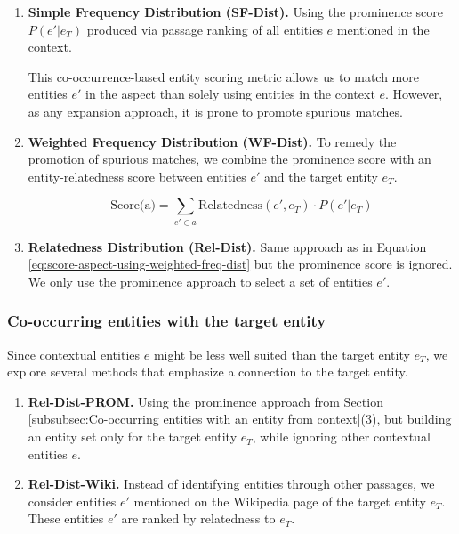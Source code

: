 \begin{enumerate}
     \item \textbf{Simple Frequency Distribution (SF-Dist).}
     Using the prominence score $P(e' \vert e_T)$ produced via passage ranking of all entities $e$ mentioned in the context.

This co-occurrence-based entity scoring metric allows us to match more entities $e'$ in the aspect than solely using entities in the context $e$. However, as any expansion approach, it is prone to promote spurious matches. 
 
 \item \textbf{Weighted Frequency Distribution (WF-Dist).} 
 To remedy the promotion of spurious matches, we combine the prominence score with an entity-relatedness score between entities $e'$ and the target entity $e_T$.
 
 \begin{equation}
         \label{eq:score-aspect-using-weighted-freq-dist}
        \text{Score(a)} = \sum_{e' \in a} \text{Relatedness}(e', e_T) \cdot P(e' \vert e_T)
    \end{equation}


\item \textbf{Relatedness Distribution (Rel-Dist).} 
Same approach as in Equation  \ref{eq:score-aspect-using-weighted-freq-dist} but the prominence score is ignored. We only use the prominence approach to select a set of entities $e'$. 

\end{enumerate}

\subsubsection{Co-occurring entities with the target entity} 
\label{subsubsec:Co-occurring entities with the target entity}

Since contextual entities $e$ might be less well suited than the target entity $e_T$, we explore several methods that emphasize a connection to the target entity.




\begin{enumerate}
    \item \textbf{Rel-Dist-PROM.} Using the prominence approach from Section \ref{subsubsec:Co-occurring entities with an entity from context}(3), but building an entity set only for the target entity $e_T$, while ignoring other contextual entities $e$.
    \item \textbf{Rel-Dist-Wiki.} Instead of identifying entities through other passages, we consider entities $e'$ mentioned on the Wikipedia page of the target entity $e_T$. These entities $e'$ are ranked by relatedness to $e_T$.
\end{enumerate}


